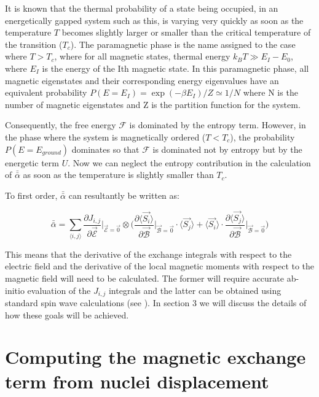 \documentclass[10pt]{article}
\begin{document}
It is known that the thermal probability of a state being occupied, in an energetically gapped system such as this, is varying very quickly as soon as the temperature $T$ becomes slightly larger or smaller than the critical temperature of the transition ($T_c$). The paramagnetic phase is the name assigned to the case where $T > T_c$, where for all magnetic states, thermal energy $k_B T \gg E_I - E_0$, where $E_I$ is the energy of the Ith magnetic state. In this paramagnetic phase, all magnetic eigenstates and their corresponding energy eigenvalues have an equivalent probability $P(E = E_I) = \exp(-\beta E_I)/Z \simeq 1/N$ where N is the number of magnetic eigenstates and Z is the partition function for the system. 

Consequently, the free energy $\mathcal{F}$ is dominated by the entropy term. However, in the phase where the system is magnetically ordered ($T < T_c$), the probability $P(E = E_{ground})$ dominates so that $\mathcal{F}$ is dominated not by entropy but by the energetic term $U$. Now we can neglect the entropy contribution in the calculation of $\bar{\bar{\alpha}}$ as soon as the temperature is slightly smaller than $T_c$.

To first order, $\bar{\bar{\alpha}}$ can resultantly be written as:

\begin{equation}
	\bar{\bar{\alpha}} = \sum_{\langle i,j \rangle} \frac{\partial J_{i,j}}{\partial \vec{\mathcal{E}}}\biggr\vert_{\vec{\mathcal{E}}=\vec{0}}\otimes\biggr(\frac{\partial \langle \vec{S_i}\rangle}{\partial \vec{\mathcal{B}}}\biggr\vert_{\vec{\mathcal{B}} = \vec{0}}\cdot\langle\vec{S_j}\rangle + \langle\vec{S_i}\rangle\cdot\frac{\partial \langle \vec{S_j}\rangle}{\partial\vec{\mathcal{B}}}\biggr\vert_{\vec{\mathcal{B}}=\vec{0}}\biggr)
\end{equation}

This means that the derivative of the exchange integrals with respect to the electric field and the derivative of the local magnetic moments with respect to the magnetic field will need to be calculated. The former will require accurate ab-initio evaluation of the $J_{i,j}$ integrals and the latter can be obtained using standard spin wave calculations (see \cite{anderson1951limits,kubo1952spin,oguchi1960theory}). In section 3 we will discuss the details of how these goals will be achieved.

\section{Computing the magnetic exchange term from nuclei displacement}
\end{document}

